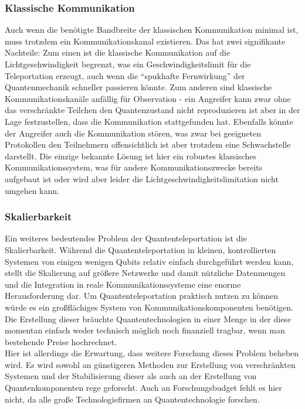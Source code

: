 \subsubsection{Klassische Kommunikation}
Auch wenn die benötigte Bandbreite der klassischen Kommunikation minimal ist, muss trotzdem ein Kommunikationskanal
existieren.
Das hat zwei signifikante Nachteile: Zum einen ist die klassische Kommunikation auf die Lichtgeschwindigkeit begrenzt,
was ein Geschwindigkeitslimit für die Teleportation erzeugt, auch wenn die ``spukhafte Fernwirkung'' der Quantenmechanik
schneller passieren könnte\cite{hensen2015loophole}.
Zum anderen sind klassische Kommunikationskanäle anfällig für Observation - ein Angreifer kann zwar
ohne das verschränkte Teilchen den Quantenzustand nicht reproduzieren ist aber in der Lage festzustellen, dass die
Kommunikation stattgefunden hat.
Ebenfalls könnte der Angreifer auch die Kommunikation stören, was zwar bei geeigneten Protokollen den Teilnehmern
offensichtlich ist aber trotzdem eine Schwachstelle darstellt.
Die einzige bekannte Lösung ist hier ein robustes klassisches Kommunikationssystem, was für andere Kommunikationszwecke
bereits aufgebaut ist oder wird aber leider die Lichtgeschwindigkeitslimitation nicht umgehen kann.


\subsubsection{Skalierbarkeit}

Ein weiteres bedeutendes Problem der Quantenteleportation ist die Skalierbarkeit.
Während die Quantenteleportation in kleinen, kontrollierten Systemen von einigen wenigen Qubits relativ einfach durchgeführt werden kann,
stellt die Skalierung auf größere Netzwerke und damit nützliche Datenmengen und die Integration in reale Kommunikationssysteme eine enorme Herausforderung dar.
Um Quantenteleportation praktisch nutzen zu können würde es ein großflächiges System von Kommunikationskomponenten
benötigen.
Die Erstellung dieser bräuchte Quantentechnologien in einer Menge in der diese momentan einfach weder technisch möglich
noch finanziell tragbar, wenn man bestehende Preise hochrechnet.\\

Hier ist allerdings die Erwartung, dass weitere Forschung dieses Problem beheben wird.
Es wird sowohl an günstigeren Methoden zur Erstellung von verschränkten Systemen und der Stabilisierung dieser
als auch an der Erstellung von Quantenkomponenten rege geforscht.
Auch an Forschungsbudget fehlt es hier nicht, da alle große Technologiefirmen an Quantentechnologie forschen.

